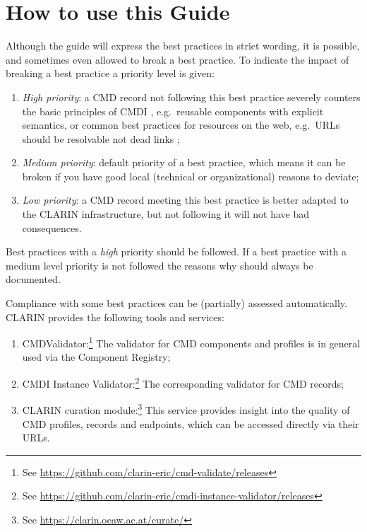 \section{How to use this Guide}\label{howto}

Although the guide will express the best practices in strict wording, it is possible, and sometimes even allowed to break a best practice. To indicate the impact of breaking a best practice a priority level is given:

\begin{enumerate}
\def\labelenumi{\arabic{enumi}.}
\tightlist
\item
  \emph{High priority}: a CMD record not following this best practice severely counters the basic principles of CMDI , e.g.~reusable components with explicit semantics, or common best practices for resources on the web, e.g.~URLs should be resolvable not dead links ;
\item
  \emph{Medium priority}: default priority of a best practice, which means it can be broken if you have good local (technical or organizational) reasons to deviate;
\item
  \emph{Low priority}: a CMD record meeting this best practice is better adapted to the CLARIN infrastructure, but not following it will not have bad consequences.
\end{enumerate}

Best practices with a \emph{high} priority should be followed. If a best practice with a medium level priority is not followed the reasons why should always be documented.

Compliance with some best practices can be (partially) assessed
automatically. CLARIN provides the following tools and services:

\begin{enumerate}
\def\labelenumi{\arabic{enumi}.}
\tightlist
\item
  CMDValidator:\footnote{See
    \url{https://github.com/clarin-eric/cmd-validate/releases}} The validator for CMD components and profiles is in general used via the Component Registry;
\item
  CMDI Instance Validator:\footnote{See
    \url{https://github.com/clarin-eric/cmdi-instance-validator/releases}}
  The corresponding validator for CMD records;
\item
  CLARIN curation module:\footnote{See
    \url{https://clarin.oeaw.ac.at/curate/}} This service provides insight into the quality of CMD profiles, records and endpoints, which can be accessed directly via their URLs.
\end{enumerate}

